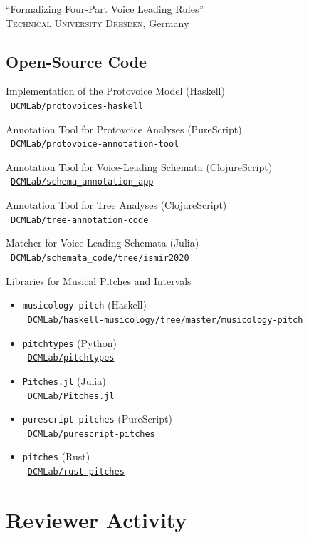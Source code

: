 \documentclass[10pt]{scrartcl}
\newcommand{\margintext}[1]{\marginpar{\raggedleft\small#1}}
\newcommand{\entry}[1]{\vphantom{x}\margintext{#1}}
\begin{document}
\entry{2017}%
\invited \enquote{Formalizing Four-Part Voice Leading Rules}
\\
\textsc{Technical University Dresden}, Germany

\subsection*{Open-Source Code}

\newcommand{\codelink}[1]{\faCodeFork\ \href{https://#1}{\nolinkurl{#1}}}
\newcommand{\ghlink}[1]{\faGithub\ \href{https://github.com/#1}{\nolinkurl{#1}}}

Implementation of the Protovoice Model (Haskell)\\
\ghlink{DCMLab/protovoices-haskell}

Annotation Tool for Protovoice Analyses (PureScript)\\
\ghlink{DCMLab/protovoice-annotation-tool}

Annotation Tool for Voice-Leading Schemata (ClojureScript)\\
\ghlink{DCMLab/schema_annotation_app}

Annotation Tool for Tree Analyses (ClojureScript)\\
\ghlink{DCMLab/tree-annotation-code}

Matcher for Voice-Leading Schemata (Julia)\\
\ghlink{DCMLab/schemata_code/tree/ismir2020}

Libraries for Musical Pitches and Intervals
\begin{itemize}
\item \texttt{musicology-pitch} (Haskell)\\
  \ghlink{DCMLab/haskell-musicology/tree/master/musicology-pitch}
\item \texttt{pitchtypes} (Python)\\
  \ghlink{DCMLab/pitchtypes}
\item \texttt{Pitches.jl} (Julia)\\
  \ghlink{DCMLab/Pitches.jl}
\item \texttt{purescript-pitches} (PureScript)\\
  \ghlink{DCMLab/purescript-pitches}
\item \texttt{pitches} (Rust)\\
  \ghlink{DCMLab/rust-pitches}
\end{itemize}

\section*{Reviewer Activity}
\end{document}
